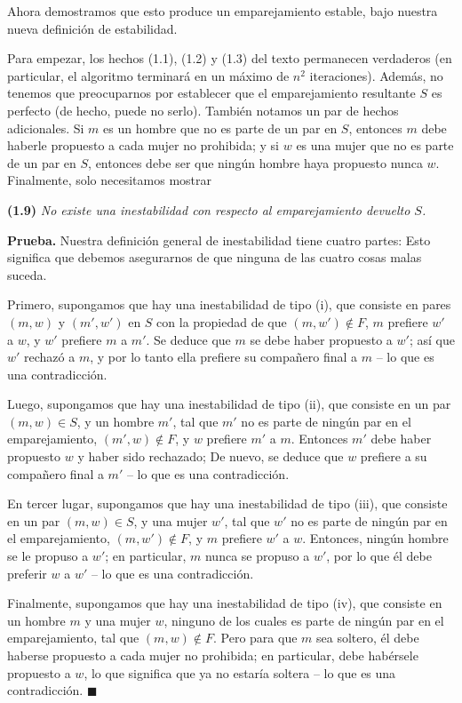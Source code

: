 \documentclass[a4paper, 12pt]{book}
\theoremstyle{dotless}
\begin{document}
Ahora demostramos que esto produce un emparejamiento estable, bajo nuestra nueva definición de estabilidad.

Para empezar, los hechos (1.1), (1.2) y (1.3) del texto permanecen verdaderos (en particular, el algoritmo terminará en un máximo de $n^2$ iteraciones). Además, no tenemos que preocuparnos por establecer que el emparejamiento resultante $S$ es perfecto (de hecho, puede no serlo). También notamos un par de hechos adicionales. Si $m$ es un hombre que no es parte de un par en $S$, entonces $m$ debe haberle propuesto a cada mujer no prohibida; y si $w$ es una mujer que no es parte de un par en $S$, entonces debe ser que ningún hombre haya propuesto nunca $w$. Finalmente, solo necesitamos mostrar

\vspace{3mm}
\noindent\textbf{(1.9)} \textit{No existe una inestabilidad con respecto al emparejamiento devuelto $S$.}
\vspace{2mm}

\textbf{Prueba.} Nuestra definición general de inestabilidad tiene cuatro partes: Esto significa que debemos asegurarnos de que ninguna de las cuatro cosas malas suceda.

Primero, supongamos que hay una inestabilidad de tipo (i), que consiste en pares $(m,w)$ y $(m',w')$ en $S$ con la propiedad de que $(m,w') \notin F$, $m$ prefiere $w'$ a $w$, y $w'$ prefiere $m$ a $m'$. Se deduce que $m$ se debe haber propuesto a $w'$; así que $w'$ rechazó a $m$, y por lo tanto ella prefiere su compañero final a $m$ -- lo que es una contradicción.

Luego, supongamos que hay una inestabilidad de tipo (ii), que consiste en un par $(m,w) \in S$, y un hombre $m'$, tal que $m'$ no es parte de ningún par en el emparejamiento, $(m',w) \notin F$, y $w$ prefiere $m'$ a $m$. Entonces $m'$ debe haber propuesto $w$ y haber sido rechazado; De nuevo, se deduce que $w$ prefiere a su compañero final a $m'$ -- lo que es una contradicción. 

En tercer lugar, supongamos que hay una inestabilidad de tipo (iii), que consiste en un par $(m,w) \in S$, y una mujer $w'$, tal que $w'$ no es parte de ningún par en el emparejamiento, $(m,w') \notin F$, y $m$ prefiere $w'$ a $w$. Entonces, ningún hombre se le propuso a $w'$; en particular, $m$ nunca se propuso a $w'$, por lo que él debe preferir $w$ a $w'$ -- lo que es una contradicción.

Finalmente, supongamos que hay una inestabilidad de tipo (iv), que consiste en un hombre $m$ y una mujer $w$, ninguno de los cuales es parte de ningún par en el emparejamiento, tal que $(m,w) \notin F$. Pero para que $m$ sea soltero, él debe haberse propuesto a cada mujer no prohibida; en particular, debe habérsele propuesto a $w$, lo que significa que ya no estaría soltera -- lo que es una contradicción. $ \blacksquare $
\end{document}
